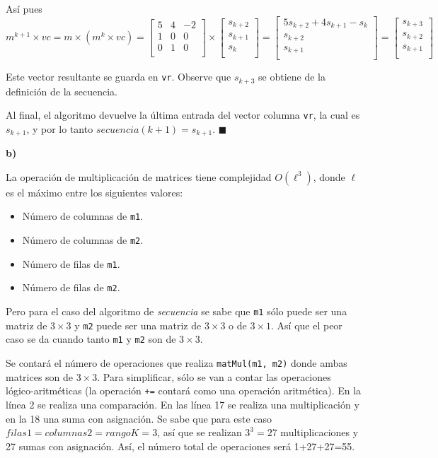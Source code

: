 \documentclass{article}
\begin{document}
Así pues
\[
m^{k+1} \times vc = m \times (m^k \times vc) =
\begin{bmatrix}
5 & 4 & -2 \\
1 & 0 & 0 \\
0 & 1 & 0 \\
\end{bmatrix}
\times
\begin{bmatrix}
s_{k+2} \\
s_{k+1} \\
s_k \\
\end{bmatrix}
=
\begin{bmatrix}
5s_{k+2} + 4s_{k+1} - s_k \\
s_{k+2} \\
s_{k+1} \\
\end{bmatrix}
=
\begin{bmatrix}
s_{k+3} \\
s_{k+2} \\
s_{k+1} \\
\end{bmatrix}
\]

Este vector resultante se guarda en \texttt{vr}. Observe que $s_{k+3}$ se obtiene de la definición de la secuencia.

Al final, el algoritmo devuelve la última entrada del vector columna \texttt{vr}, la cual es $s_{k+1}$, y por lo tanto $secuencia(k+1) = s_{k+1}$. $\blacksquare$

\textbf{b)}

La operación de multiplicación de matrices tiene complejidad $O(\ell ^3)$, donde $\ell$ es el máximo entre los siguientes valores:
\begin{itemize}
\item Número de columnas de \texttt{m1}.
\item Número de columnas de \texttt{m2}.
\item Número de filas de \texttt{m1}.
\item Número de filas de \texttt{m2}.
\end{itemize}

Pero para el caso del algoritmo de \textit{secuencia} se sabe que \texttt{m1} sólo puede ser una matriz de $3 \times 3$ y \texttt{m2} puede ser una matriz de $3 \times 3$ o de $3 \times 1$. Así que el peor caso se da cuando tanto \texttt{m1} y \texttt{m2} son de $3 \times 3$.

Se contará el número de operaciones que realiza \texttt{matMul(m1, m2)} donde ambas matrices son de $3 \times 3$. Para simplificar, sólo se van a contar las operaciones lógico-aritméticas (la operación \texttt{+=} contará como una operación aritmética). En la línea 2 se realiza una comparación. En las línea 17 se realiza una multiplicación y en la 18 una suma con asignación. Se sabe que para este caso $filas1=columnas2=rangoK=3$, así que se realizan $3^3 = 27$ multiplicaciones y 27 sumas con asignación. Así, el número total de operaciones será 1+27+27=55.
\end{document}

